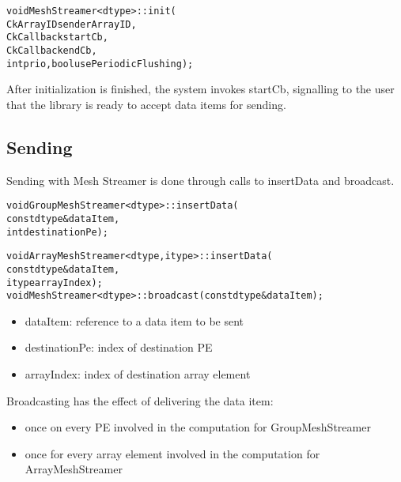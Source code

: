 \begin{alltt}
void MeshStreamer<dtype>::init(
                  CkArrayID senderArrayID,
                  CkCallback startCb, 
                  CkCallback endCb, 
                  int prio, bool usePeriodicFlushing);
\end{alltt}

After initialization is finished, the system invokes startCb,
signalling to the user that the library is ready to accept data items
for sending. 
\\


\subsection{Sending}

Sending with Mesh Streamer is done through calls to insertData and broadcast. 

\begin{alltt}
void GroupMeshStreamer<dtype>::insertData(
                       const dtype &dataItem, 
                       int destinationPe);
\end{alltt}

\begin{alltt}
void ArrayMeshStreamer<dtype, itype>::insertData(
                       const dtype &dataItem,
                       itype arrayIndex);
void MeshStreamer<dtype>::broadcast(const dtype& dataItem);
\end{alltt}

\begin{itemize}
\item dataItem: reference to a data item to be sent
\item destinationPe: index of destination PE
\item arrayIndex: index of destination array element
\end{itemize}

Broadcasting has the effect of delivering the data item:
\begin{itemize}
\item {once on every PE involved in the computation for GroupMeshStreamer}
\item {once for every array element involved in the computation for
       ArrayMeshStreamer}
\end{itemize}


